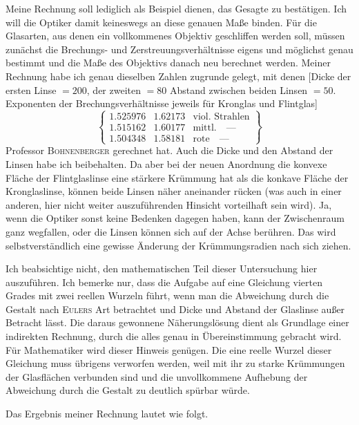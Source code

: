 Meine Rechnung soll lediglich als Beispiel dienen, das Gesagte zu bestätigen. Ich will die Optiker damit keineswegs an diese genauen Maße binden. Für die Glasarten, aus denen ein vollkommenes Objektiv geschliffen werden soll, müssen zunächst die Brechungs- und Zerstreuungsverhältnisse eigens und möglichst genau bestimmt und die Maße des Objektivs danach neu berechnet werden. Meiner Rechnung habe ich genau dieselben Zahlen zugrunde gelegt, mit denen
\expandafter\def\csname HistoricalNoteText513\endcsname{[Dicke der ersten Linse $=200$, der zweiten $=80$ Abstand zwischen beiden Linsen $=50$. Exponenten der Brechungsverhältnisse jeweils für Kronglas und Flintglas]
\[
\left\{\begin{array}{lll}
1.525976&1.62173&\text{viol. Strahlen}\\
1.515162&1.60177&\text{mittl.}\quad\text{—}\\
1.504348&1.58181&\text{rote}\quad\text{—}
\end{array}\right\}
\]
}Professor \textsc{Bohnenberger} gerechnet hat. Auch die Dicke und den Abstand der Linsen habe ich beibehalten. Da aber bei der neuen Anordnung die konvexe Fläche der Flintglaslinse eine stärkere Krümmung hat als die konkave Fläche der Kronglaslinse, können beide Linsen näher aneinander rücken (was auch in einer anderen, hier nicht weiter auszuführenden Hinsicht vorteilhaft sein wird). Ja, wenn die Optiker sonst keine Bedenken dagegen haben, kann der Zwischenraum ganz wegfallen, oder die Linsen können sich auf der Achse berühren. Das wird selbstverständlich eine gewisse Änderung der Krümmungsradien nach sich ziehen.

Ich beabsichtige nicht, den mathematischen Teil dieser Untersuchung hier auszuführen. Ich bemerke nur, dass die Aufgabe auf eine Gleichung vierten Grades mit zwei reellen Wurzeln führt, wenn man die Abweichung durch die Gestalt nach \textsc{Eulers} Art betrachtet und Dicke und Abstand der Glaslinse außer Betracht lässt. Die daraus gewonnene Näherungslösung dient als Grundlage einer indirekten Rechnung, durch die alles genau in Übereinstimmung gebracht wird. Für Mathematiker wird dieser Hinweis genügen. Die eine reelle Wurzel dieser Gleichung muss übrigens verworfen werden, weil mit ihr zu starke Krümmungen der Glasflächen verbunden sind und die unvollkommene Aufhebung der Abweichung durch die Gestalt zu deutlich spürbar würde.

Das Ergebnis meiner Rechnung lautet wie folgt.

